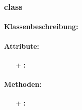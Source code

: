 \subsubsection{class }


\paragraph{Klassenbeschreibung:}
\paragraph{Attribute:}
\begin{itemize}
	\item[+] \textbf{:}\\
\end{itemize}
\paragraph{Methoden:}
\begin{itemize}
    \item[+] \textbf{:}\\
\end{itemize} 
